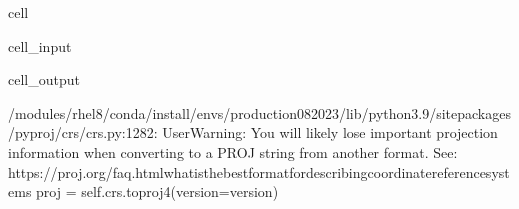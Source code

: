 \documentclass[letterpaper,10pt,english]{jupyterBook}
\begin{document}
\begin{sphinxuseclass}{cell}
\begin{sphinxVerbatimInput}
\begin{sphinxuseclass}{cell_input}
\begin{sphinxVerbatim}[commandchars=\\\{\}]
              
              
              
              
              
              
              
              
\end{sphinxVerbatim}

\end{sphinxuseclass}\end{sphinxVerbatimInput}
\begin{sphinxVerbatimOutput}

\begin{sphinxuseclass}{cell_output}
\begin{sphinxVerbatim}[commandchars=\\\{\}]
/modules/rhel8/conda/install/envs/production\PYGZhy{}08\PYGZhy{}2023/lib/python3.9/site\PYGZhy{}packages/pyproj/crs/crs.py:1282: UserWarning: You will likely lose important projection information when converting to a PROJ string from another format. See: https://proj.org/faq.html\PYGZsh{}what\PYGZhy{}is\PYGZhy{}the\PYGZhy{}best\PYGZhy{}format\PYGZhy{}for\PYGZhy{}describing\PYGZhy{}coordinate\PYGZhy{}reference\PYGZhy{}systems
  proj = self.\PYGZus{}crs.to\PYGZus{}proj4(version=version)
\end{sphinxVerbatim}

\end{sphinxuseclass}\end{sphinxVerbatimOutput}

\end{sphinxuseclass}
\end{document}
